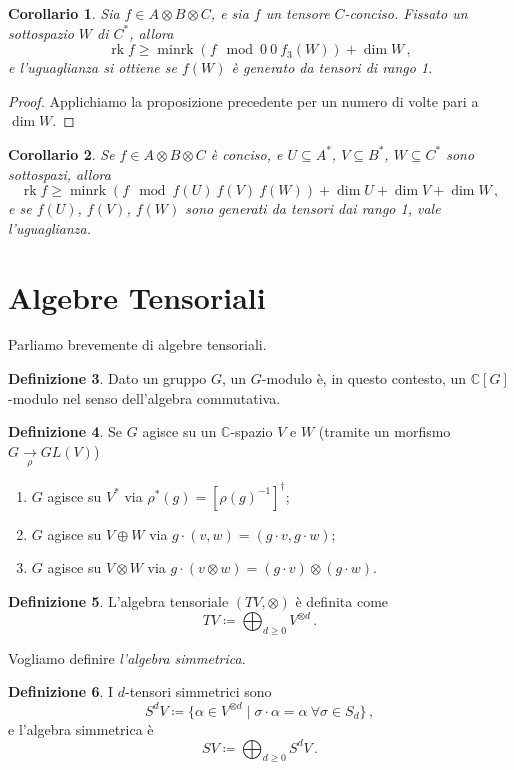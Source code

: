 \documentclass[a4paper, 11pt]{article}
\theoremstyle{definition}
\newtheorem{Def}{Definizione}[section]
\theoremstyle{plain}
\newtheorem{Cor}[Def]{Corollario}
\newcommand{\C}{\mathbb{C}}
\newcommand{\deff}{\coloneqq}
\DeclareMathOperator{\rk}{rk}
\DeclareMathOperator{\minrkop}{minrk}
\newcommand{\minrk}[4]{\minrkop(#1 \!\!\!\mod #2\ #3\ #4)}
\begin{document}
\begin{Cor}
	Sia $f \in A \otimes B \otimes  C$, e sia $f$ un tensore $C$-conciso. Fissato un sottospazio $W$ di $C^*$, allora
	\[
		\rk f \ge \minrk{f}{0}{0}{f_3(W)} + \dim W\,,
	\]
	e l'uguaglianza si ottiene se $f(W)$ è generato da tensori di rango 1.
\end{Cor}
\begin{proof}
	Applichiamo la proposizione precedente per un numero di volte pari a $\dim W$.
\end{proof}
\begin{Cor}
	Se $f \in A \otimes B \otimes C$ è conciso, e $U \subseteq A^*$, $V \subseteq B^*$, $W \subseteq C^*$ sono sottospazi, allora
	\[
		\rk f \ge \minrk{f}{f(U)}{f(V)}{f(W)} + \dim U + \dim V + \dim W\,,
	\]
	e se $f(U)$, $f(V)$, $f(W)$ sono generati da tensori dai rango 1, vale l'uguaglianza.
\end{Cor}

\section{Algebre Tensoriali}

Parliamo brevemente di algebre tensoriali.
\begin{Def}
	Dato un gruppo $G$, un $G$-modulo è, in questo contesto, un $\C[G]$-modulo nel senso dell'algebra commutativa.
\end{Def}
\begin{Def}
	Se $G$ agisce su un $\C$-spazio $V$ e $W$ (tramite un morfismo $G \underset{\rho}{\to} GL(V)$)
	\begin{enumerate}
		\item $G$ agisce su $V^*$ via $\rho^*(g) = [\rho(g)^{-1}]^\dagger$;
		\item $G$ agisce su $V \oplus W$ via $g \cdot (v,w) = (g\cdot v, g\cdot w)$;
		\item $G$ agisce su $V \otimes W$ via $g \cdot (v\otimes w) = (g\cdot v)\otimes (g\cdot w)$.
	\end{enumerate}
\end{Def}
\begin{Def}
	L'algebra tensoriale $(TV, \otimes)$ è definita come
	\[
		TV \deff \bigoplus_{d \ge 0} V^{\otimes d}\,.
	\]
\end{Def}

Vogliamo definire \emph{l'algebra simmetrica}. 
\begin{Def}
	I $d$-tensori simmetrici sono 
	\[
		S^d V \deff \{\alpha \in V^{\otimes d} \mid \sigma \cdot \alpha = \alpha\ \forall \sigma \in S_d \}\,,
	\]
	e l'algebra simmetrica è
	\[
		SV \deff \bigoplus_{d \ge 0} S^{d}V\,.
	\]
\end{Def}
\end{document}
